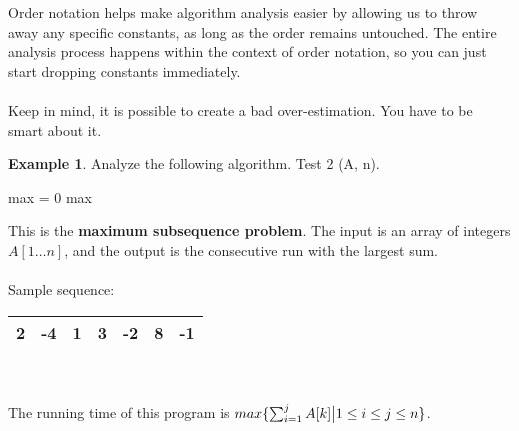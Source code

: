\documentclass[]{article}
\theoremstyle{definition}
\newtheorem{ex}{Example}[section]
\DeclarePairedDelimiter{\set}{\lbrace}{\rbrace}
\begin{document}
			Order notation helps make algorithm analysis easier by allowing us to throw away any specific constants, as long as the order remains untouched. The entire analysis process happens within the context of order notation, so you can just start dropping constants immediately.
			\\ \\
			Keep in mind, it is possible to create a bad over-estimation. You have to be smart about it.

			\begin{ex}
				Analyze the following algorithm. Test 2 (A, n). \\
				\begin{algorithm}[H]
					max = 0\;
					\Return max
				\end{algorithm}
				
				This is the \textbf{maximum subsequence problem}. The input is an array of integers $A[1\dots n]$, and the output is the consecutive run with the largest sum.
				\\ \\
				Sample sequence:
				\begin{tabular}{|c|c|c|c|c|c|c|}
					\hline 2 & -4 & 1 & 3 & -2 & 8 & -1 \\ \hline
				\end{tabular}
				\\ \\
				The running time of this program is $max \set{\sum_{i = 1}^{j} A[k] \big| 1 \le i \le j \le n}$.
			\end{ex}
\end{document}
